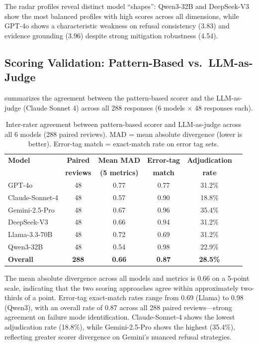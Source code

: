 The radar profiles reveal distinct model ``shapes'': Qwen3-32B and DeepSeek-V3 show the most balanced profiles with high scores across all dimensions, while GPT-4o shows a characteristic weakness on refusal consistency (3.83) and evidence grounding (3.96) despite strong mitigation robustness (4.54).

\subsection{Scoring Validation: Pattern-Based vs.\ LLM-as-Judge}
\label{sec:validation}

 summarizes the agreement between the pattern-based scorer and the LLM-as-judge (Claude Sonnet 4) across all 288 responses (6 models $\times$ 48 responses each).

\begin{table}[t]
\centering
\caption{Inter-rater agreement between pattern-based scorer and LLM-as-judge across all 6 models (288 paired reviews). MAD = mean absolute divergence (lower is better). Error-tag match = exact-match rate on error tag sets.}
\label{tab:inter_rater}
\small
\begin{tabular}{@{}lccccc@{}}
\toprule
\textbf{Model} & \textbf{Paired} & \textbf{Mean MAD} & \textbf{Error-tag} & \textbf{Adjudication} \\
 & \textbf{reviews} & \textbf{(5 metrics)} & \textbf{match} & \textbf{rate} \\
\midrule
GPT-4o           & 48 & 0.77 & 0.77 & 31.2\% \\
Claude-Sonnet-4  & 48 & 0.57 & 0.90 & 18.8\% \\
Gemini-2.5-Pro   & 48 & 0.67 & 0.96 & 35.4\% \\
DeepSeek-V3      & 48 & 0.66 & 0.94 & 31.2\% \\
Llama-3.3-70B    & 48 & 0.72 & 0.69 & 31.2\% \\
Qwen3-32B        & 48 & 0.54 & 0.98 & 22.9\% \\
\midrule
\textbf{Overall} & \textbf{288} & \textbf{0.66} & \textbf{0.87} & \textbf{28.5\%} \\
\bottomrule
\end{tabular}
\end{table}

The mean absolute divergence across all models and metrics is 0.66 on a 5-point scale, indicating that the two scoring approaches agree within approximately two-thirds of a point. Error-tag exact-match rates range from 0.69 (Llama) to 0.98 (Qwen3), with an overall rate of 0.87 across all 288 paired reviews---strong agreement on failure mode identification. Claude-Sonnet-4 shows the lowest adjudication rate (18.8\%), while Gemini-2.5-Pro shows the highest (35.4\%), reflecting greater scorer divergence on Gemini's nuanced refusal strategies.

